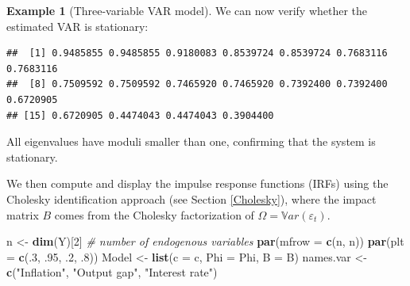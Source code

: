 \documentclass[
  11pt,
]{book}
\newenvironment{Shaded}{\begin{snugshade}}{\end{snugshade}}
\newcommand{\AttributeTok}[1]{\textcolor[rgb]{0.13,0.29,0.53}{#1}}
\newcommand{\CommentTok}[1]{\textcolor[rgb]{0.56,0.35,0.01}{\textit{#1}}}
\newcommand{\DecValTok}[1]{\textcolor[rgb]{0.00,0.00,0.81}{#1}}
\newcommand{\FunctionTok}[1]{\textcolor[rgb]{0.13,0.29,0.53}{\textbf{#1}}}
\newcommand{\NormalTok}[1]{#1}
\newcommand{\OtherTok}[1]{\textcolor[rgb]{0.56,0.35,0.01}{#1}}
\newcommand{\SpecialCharTok}[1]{\textcolor[rgb]{0.81,0.36,0.00}{\textbf{#1}}}
\newcommand{\StringTok}[1]{\textcolor[rgb]{0.31,0.60,0.02}{#1}}
\theoremstyle{definition}
\theoremstyle{definition}
\newtheorem{example}{Example}[chapter]
\theoremstyle{definition}
\theoremstyle{definition}
\theoremstyle{remark}
\begin{document}
\begin{example}[Three-variable VAR model]
We can now verify whether the estimated VAR is stationary:

\begin{Shaded}
\end{Shaded}

\begin{verbatim}
##  [1] 0.9485855 0.9485855 0.9180083 0.8539724 0.8539724 0.7683116 0.7683116
##  [8] 0.7509592 0.7509592 0.7465920 0.7465920 0.7392400 0.7392400 0.6720905
## [15] 0.6720905 0.4474043 0.4474043 0.3904400
\end{verbatim}

All eigenvalues have moduli smaller than one, confirming that the system is stationary.

We then compute and display the impulse response functions (IRFs) using the Cholesky identification approach (see Section \ref{Cholesky}), where the impact matrix \(B\) comes from the Cholesky factorization of \(\Omega = \mathbb{V}ar(\varepsilon_t)\).

\begin{Shaded}
\begin{Highlighting}[]
\NormalTok{n }\OtherTok{\textless{}{-}} \FunctionTok{dim}\NormalTok{(Y)[}\DecValTok{2}\NormalTok{] }\CommentTok{\# number of endogenous variables}
\FunctionTok{par}\NormalTok{(}\AttributeTok{mfrow =} \FunctionTok{c}\NormalTok{(n, n))}
\FunctionTok{par}\NormalTok{(}\AttributeTok{plt =} \FunctionTok{c}\NormalTok{(.}\DecValTok{3}\NormalTok{, .}\DecValTok{95}\NormalTok{, .}\DecValTok{2}\NormalTok{, .}\DecValTok{8}\NormalTok{))}
\NormalTok{Model }\OtherTok{\textless{}{-}} \FunctionTok{list}\NormalTok{(}\AttributeTok{c =}\NormalTok{ c, }\AttributeTok{Phi =}\NormalTok{ Phi, }\AttributeTok{B =}\NormalTok{ B)}
\NormalTok{names.var }\OtherTok{\textless{}{-}} \FunctionTok{c}\NormalTok{(}\StringTok{"Inflation"}\NormalTok{, }\StringTok{"Output gap"}\NormalTok{, }\StringTok{"Interest rate"}\NormalTok{)}


\end{Highlighting}
\end{Shaded}
\end{example}
\end{document}
